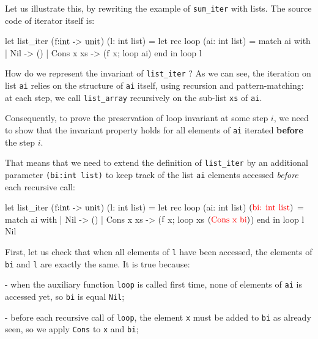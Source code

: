 \documentclass[a4paper,11pt,oneside]{article}
\theoremstyle{plain}
\begin{document}
Let us illustrate this, by rewriting the example of \texttt{sum\_iter} with lists.
The source code of iterator itself is:
\begin{small}	
\begin{whycode}  
let list_iter ($\textcolor{black}{\text{f:int -> unit}}$) (l: int list)
 = let rec loop (ai: int list)   
    = match ai with 
       | Nil       -> ()
       | Cons x xs -> ($\textcolor{black}{\text{f}}$ x; loop ai) end
   in loop l  
 	\end{whycode}
 \end{small}	 
How do we represent the invariant of \texttt{list\_iter} ? As we can see, the iteration on list \texttt{ai} relies on the structure of \texttt{ai} itself, using recursion and pattern-matching: at each step, we call \texttt{list\_array} recursively on the sub-list \texttt{xs} of \texttt{ai}.

Consequently, to prove the preservation of loop invariant at some step $i$, we need to show that the invariant property holds for all elements of \texttt{ai} iterated \textbf{before} the step $i$.

That means that we need to extend the definition of \texttt{list\_iter} by an additional parameter \texttt{(bi:int list)} to keep track of the list \texttt{ai} elements accessed \textit{before} each recursive call: 
\begin{small}
	\begin{minipage}[t]{0.4\linewidth}	
	\begin{whycode}  
let list_iter  ($\textcolor{black}{\text{f:int -> unit}}$) (l: int list)
 = let rec loop (ai: int list) $(\textcolor{red}{\text{bi: int list}})$ = 
      match ai with 
       | Nil       -> ()
       | Cons x xs -> ($\textcolor{black}{\text{f}}$ x; loop xs $(\textcolor{red}{\text{Cons x bi}})$) end
   in loop l Nil
 	\end{whycode}
 	\end{minipage}
 \end{small}	 
 
 First, let us check that when all elements of \texttt{l} have been accessed, the elements of \texttt{bi} and  \texttt{l} are exactly the same. It is true because:
 
	- when the auxiliary function \texttt{loop} is called first time, none of elements of \texttt{ai} is accessed yet, so \texttt{bi} is equal \texttt{Nil}; 
	
	- before each recursive call of \texttt{loop}, the element \texttt{x}  must be added to \texttt{bi} as already seen, so we apply \texttt{Cons} to \texttt{x} and \texttt{bi}; 
	
\end{document}
